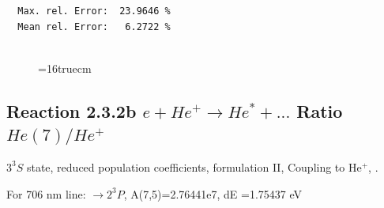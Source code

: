 \documentclass[12pt,dvips]{article}
\begin{document}
\begin{small}
\begin{verbatim}
  Max. rel. Error:  23.9646 %
  Mean rel. Error:   6.2722 %


\end{verbatim}\end{small}
\begin{figure} \label{2.3.2a}
\epsfxsize=16truecm
\end{figure}
\newpage


\subsection{
  Reaction 2.3.2b $e + He^+ \rightarrow He^* + ... $ Ratio $He(7)/He^+$
}

  $3^3S$ state,
  reduced population coefficients, formulation II,
  Coupling to He$^+$, \cite{kn:Fujimoto}.

  For 706 nm line: $\rightarrow 2^3P$, A(7,5)=2.76441e7, dE =1.75437 eV
\end{document}
